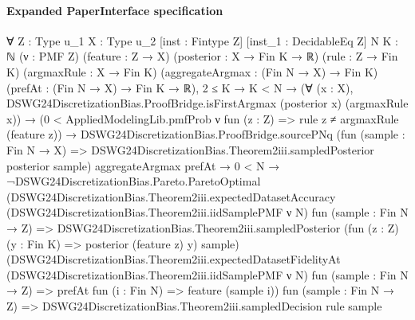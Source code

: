\documentclass[10pt]{article}
\begin{document}
\paragraph{Expanded PaperInterface specification}
\begin{ReviewVerbatim}
∀ {Z : Type u_1} {X : Type u_2} [inst : Fintype Z] [inst_1 : DecidableEq Z] {N K : ℕ} (ν : PMF Z) (feature : Z → X)
  (posterior : X → Fin K → ℝ) (rule : Z → Fin K) (argmaxRule : X → Fin K) (aggregateArgmax : (Fin N → X) → Fin K)
  (prefAt : (Fin N → X) → Fin K → ℝ),
  2 ≤ K →
    K < N →
      (∀ (x : X), DSWG24DiscretizationBias.ProofBridge.isFirstArgmax (posterior x) (argmaxRule x)) →
        (0 < AppliedModelingLib.pmfProb ν fun (z : Z) => rule z ≠ argmaxRule (feature z)) →
          DSWG24DiscretizationBias.ProofBridge.sourcePNq
              (fun (sample : Fin N → X) => DSWG24DiscretizationBias.Theorem2iii.sampledPosterior posterior sample)
              aggregateArgmax prefAt →
            0 < N →
              ¬DSWG24DiscretizationBias.Pareto.ParetoOptimal
                  (DSWG24DiscretizationBias.Theorem2iii.expectedDatasetAccuracy
                    (DSWG24DiscretizationBias.Theorem2iii.iidSamplePMF ν N) fun (sample : Fin N → Z) =>
                    DSWG24DiscretizationBias.Theorem2iii.sampledPosterior
                      (fun (z : Z) (y : Fin K) => posterior (feature z) y) sample)
                  (DSWG24DiscretizationBias.Theorem2iii.expectedDatasetFidelityAt
                    (DSWG24DiscretizationBias.Theorem2iii.iidSamplePMF ν N) fun (sample : Fin N → Z) =>
                    prefAt fun (i : Fin N) => feature (sample i))
                  fun (sample : Fin N → Z) => DSWG24DiscretizationBias.Theorem2iii.sampledDecision rule sample
\end{ReviewVerbatim}
\end{document}
